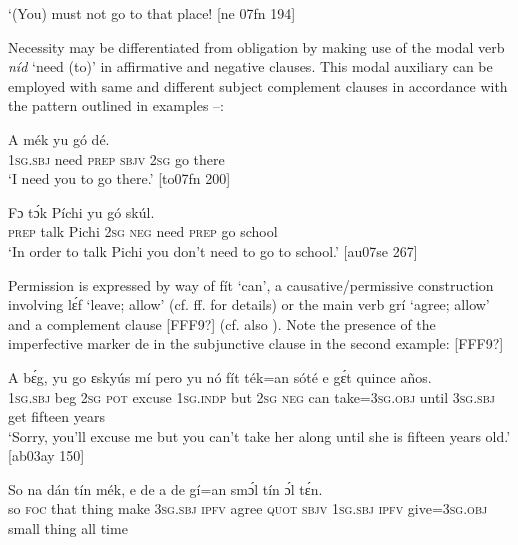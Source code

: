\glt ‘(You) must not go to that place! [ne 07fn 194]
\z

Necessity may be differentiated from obligation by making use of the modal verb \textit{níd} ‘need (to)’ in affirmative  and negative  clauses. This modal auxiliary can be employed with same and different subject complement clauses in accordance with the pattern outlined in examples –: 


\ea%
    \label{ex:key:424}
    \gll \MakeUppercase{A}        mék    yu  gó  dé.\\
\textsc{1sg.sbj}  need  \textsc{prep}  \textsc{sbjv}    \textsc{2sg}  go  there\\

\glt ‘I need you to go there.’ [to07fn 200]
\z


\ea%
    \label{ex:key:425}
    \gll Fɔ  tɔ́k  Píchi  yu        gó  skúl.\\
\textsc{prep}  talk  Pichi  \textsc{2sg}  \textsc{neg}  need  \textsc{prep}  go  school\\

\glt ‘In order to talk Pichi you don’t need to go to school.’ [au07se 267]
\z

Permission is expressed by way of fít ‘can’, a causative/permissive construction involving lɛ́f ‘leave; allow’ (cf. ff. for details) or the main verb grí ‘agree; allow’ and a complement clause [FFF9?] (cf. also ). Note the presence of the imperfective marker de in the subjunctive clause in the second example: [FFF9?]


\ea%
    \label{ex:key:426}
    \gll A    bɛ́g,    yu  go  ɛskyús  mí    pero  yu  nó  fít
ték=an    sóté    e    gɛ́t  quince  años.\\
\textsc{1sg.sbj}  beg    \textsc{2sg}  \textsc{pot}  excuse  \textsc{1sg.indp}  but    \textsc{2sg}  \textsc{neg}  can
take=\textsc{3sg.obj}  until  \textsc{3sg.sbj}  get  fifteen  years\\

\glt ‘Sorry, you’ll excuse me but you can’t take her along until she is fifteen
years old.’ [ab03ay 150]
\z


\ea%
    \label{ex:key:427}
    \gll So  na  dán  tín    mék,  e    de            
a    de  gí=an    smɔ́l  tín    ɔ́l  tɛ́n.\\
so  \textsc{foc}  that  thing  make  \textsc{3sg.sbj}  \textsc{ipfv}  agree  \textsc{quot}    \textsc{sbjv}  
\textsc{1sg.sbj}  \textsc{ipfv}  give\textsc{=3sg.obj}  small  thing  all  time\\

